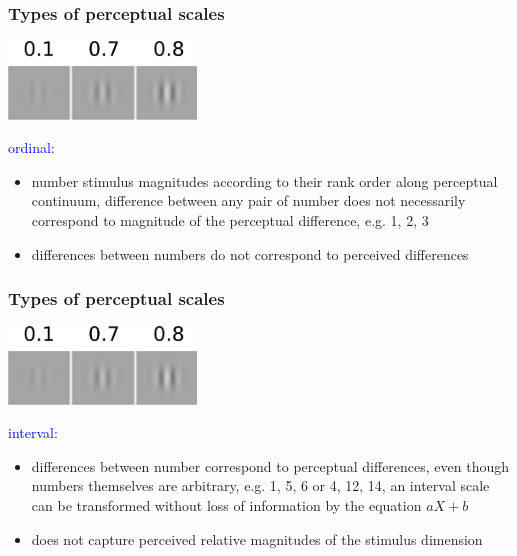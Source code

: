\documentclass[]{beamer}
\begin{document}
\begin{frame}
 \frametitle{Types of perceptual scales}
\begin{overlayarea}{110mm}{60mm}
\begin{center}
\includegraphics[width=50mm]{figs/l6/three_contrasts.png} 
\end{center}

\textcolor{blue}{ordinal:}
\begin{itemize}
 \item  number stimulus magnitudes according to their rank order along perceptual continuum, difference between any pair of number does not necessarily correspond to magnitude of the perceptual difference, e.g. 1, 2, 3 
 \item differences between numbers do not correspond to perceived differences
\end{itemize}
\end{overlayarea}
\end{frame}


\begin{frame}
 \frametitle{Types of perceptual scales}
\begin{overlayarea}{110mm}{60mm}
\begin{center}
\includegraphics[width=50mm]{figs/l6/three_contrasts.png} 
\end{center}

\textcolor{blue}{interval:}
\begin{itemize}
 \item differences between number correspond to perceptual differences, even though numbers themselves are arbitrary, e.g. 1, 5, 6 or 4, 12, 14, an interval scale can be transformed without loss of information by the equation $aX+b$
 \item does not capture perceived relative magnitudes of the stimulus dimension
\end{itemize}
\end{overlayarea}
\end{frame}
\end{document}
